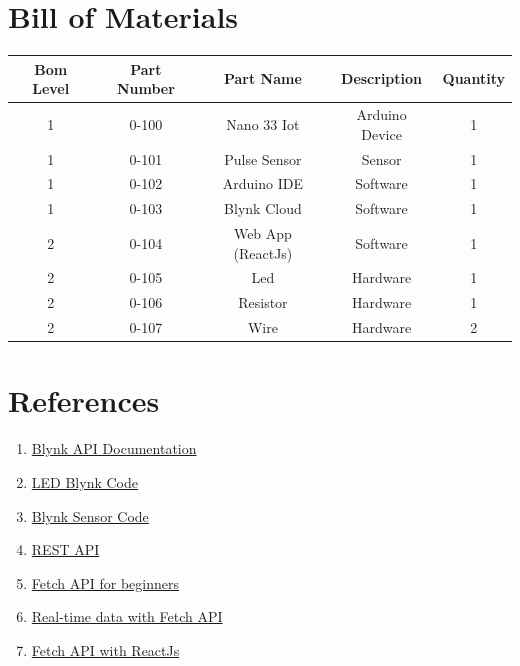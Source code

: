\documentclass{report}
\begin{document}
\section{Bill of Materials}
\begin{center}
\begin{tabular}{||c c c c c||} 
 \hline
 Bom Level & Part Number & Part Name & Description & Quantity \\ [0.5ex] 
 \hline\hline
 1 & 0-100 & Nano 33 Iot & Arduino Device & 1 \\ 
 \hline
 1 & 0-101 & Pulse Sensor & Sensor & 1 \\
 \hline
 1 & 0-102 & Arduino IDE & Software & 1 \\
 \hline
 1 & 0-103 & Blynk Cloud & Software & 1 \\
 \hline
 2 & 0-104 & Web App (ReactJs) & Software & 1 \\
 \hline
 2 & 0-105 & Led & Hardware & 1 \\
 \hline
 2 & 0-106 & Resistor & Hardware & 1 \\
 \hline
 2 & 0-107 & Wire & Hardware & 2 \\ [1ex] 
 \hline
\end{tabular}
\end{center}

 

\raggedright
\section{References}
\begin{enumerate}
  \item \href{https://docs.blynk.io/en/blynk.cloud/https-api-overview}{Blynk API Documentation}
  \item \href{ https://create.arduino.cc/projecthub/rocketman27/led-blink-with-blynk-2-0-e86daa}{LED Blynk Code}
  \item \href{https://docs.blynk.io/en/legacy-platform/legacy-articles/how-to-display-any-sensor-data-in-blynk-app}{Blynk Sensor Code} 
  \item \href{https://www.youtube.com/watch?v=E8uka5CjLKw}{REST API}
  \item \href{ https://www.youtube.com/watch?v=SPM4xyYd9MI}{Fetch API for beginners}
  \item \href{ https://www.youtube.com/watch?v=E0UGGxd2DOo}{Real-time data with Fetch API}
  \item \href{https://www.youtube.com/watch?v=T3Px88x_PsA}{Fetch API with ReactJs}
\end{enumerate}
\end{document}
